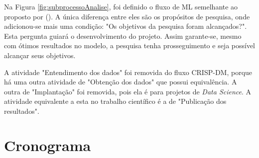 Na Figura \ref{fig:subprocessoAnalise}, foi definido o fluxo de ML semelhante ao proposto por \citeauthor{BRINK2015} (\citeyear{BRINK2015}). A única diferença entre eles são os propósitos de pesquisa, onde adicionou-se mais uma condição: "Os objetivos da pesquisa foram alcançados?". Esta pergunta guiará o desenvolvimento do projeto. Assim garante-se, mesmo com ótimos resultados no modelo, a pesquisa tenha prosseguimento e seja possível alcançar seus objetivos.

A atividade "Entendimento dos dados" foi removida do fluxo CRISP-DM, porque há uma outra atividade de "Obtenção dos dados" que possui equivalência. A outra de "Implantação" foi removida, pois ela é para projetos de \textit{Data Science}. A atividade equivalente a esta no trabalho científico é a de "Publicação dos resultados".

\section{Cronograma}

